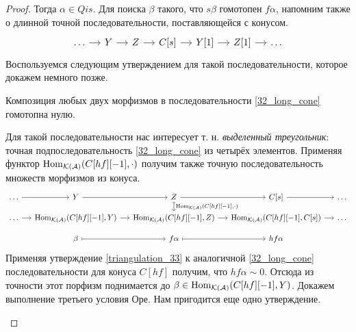 \documentclass[../main.tex]{subfiles}
\begin{document}
\begin{proof}
Тогда $\alpha \in Qis$. Для поиска $\beta$ такого, что $s\beta$ гомотопен $f\alpha$, напомним также о длинной точной последовательности, поставляющейся с конусом.
    \begin{equation}\label{32_long_cone}
        \begin{tikzcd}[sep=small]
	\ldots&Y&Z& {C[s]} & Y[1]&Z[1]&\ldots
	\arrow[from=1-2, to=1-3]
	\arrow[from=1-3, to=1-4]
 \arrow[from=1-1, to=1-2]
 \arrow[from=1-4, to=1-5]
 \arrow[from=1-5, to=1-6]
 \arrow[from=1-6, to=1-7]
\end{tikzcd}
    \end{equation}
Воспользуемся следующим утверждением для такой последовательности, которое докажем немного позже.

\begin{to_lem}\label{triangulation_33}
Композиция любых двух морфизмов в последовательности \eqref{32_long_cone} гомотопна нулю.
\end{to_lem}
Для такой последовательности нас интересует т. н. \emph{выделенный треугольник}: точная подпоследовательность \eqref{32_long_cone} из четырёх элементов. Применяя функтор $\operatorname{Hom}_{\mathcal{K}(\mathcal{A})}(C[hf][-1], \cdot)$ получим также точную последовательность множеств морфизмов из конуса.
    \begin{equation*}
       \begin{tikzcd}[sep=small]
	\ldots & Y & Z & {C[s]} & \ldots \\
	\ldots & {\Hom_{\mathcal{K}(\mathcal{A})}(C[hf][-1], Y)} & {\Hom_{\mathcal{K}(\mathcal{A})}(C[hf][-1], Z)} & {\Hom_{\mathcal{K}(\mathcal{A})}(C[hf][-1], C[s])} & \ldots \\
	& \beta & f\alpha & hf\alpha
	\arrow[from=1-2, to=1-3]
	\arrow[from=1-3, to=1-4]
	\arrow["{\Hom_{\mathcal{K}(\mathcal{A})}(C[hf][-1], \cdot)}", maps to, from=1-3, to=2-3]
	\arrow[from=2-2, to=2-3]
	\arrow[from=2-3, to=2-4]
	\arrow[maps to, from=3-3, to=3-4]
	\arrow[maps to, from=3-2, to=3-3]
	\arrow[from=1-4, to=1-5]
	\arrow[from=1-1, to=1-2]
	\arrow[from=2-1, to=2-2]
	\arrow[from=2-4, to=2-5]
\end{tikzcd}
    \end{equation*}
Применяя утверждение \ref{triangulation_33} к аналогичной \eqref{32_long_cone} последовательности для конуса $C[hf]$ получим, что $hf\alpha \sim 0$. Отсюда из точности этот порфизм поднимается до $\beta \in \operatorname{Hom}_{\mathcal{K}(\mathcal{A})}(C[hf][-1], Y)$.
Докажем выполнение третьего условия Оре. Нам пригодится еще одно утверждение.
\begin{to_lem}\label{32_additive_loc}

\end{to_lem}
\end{proof}
\end{document}
